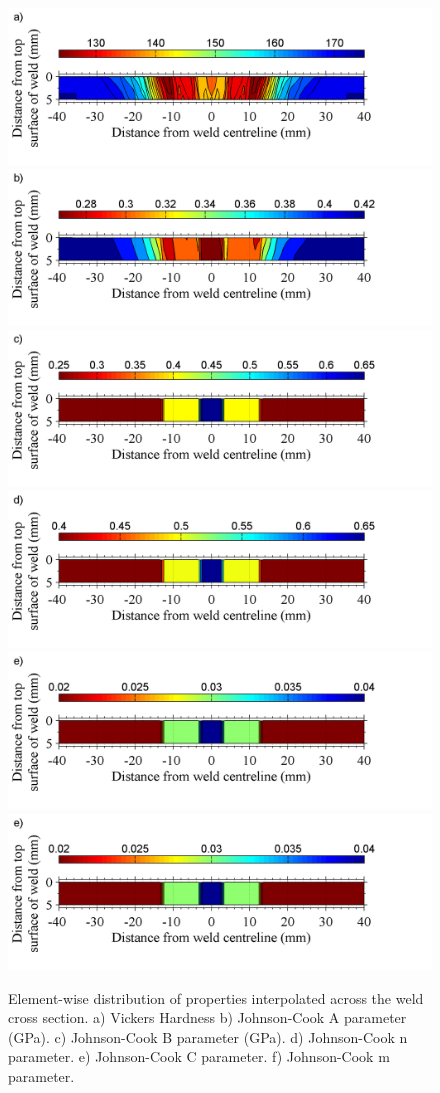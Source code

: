 \begin{figure}
	\centering
	\includegraphics[width=0.55\linewidth]{JCHValtered}
	\includegraphics[width=0.55\linewidth]{JCAaltered}
	\includegraphics[width=0.55\linewidth]{JCBaltered}
	\includegraphics[width=0.55\linewidth]{JCnaltered}
	\includegraphics[width=0.55\linewidth]{JCCaltered}
	\includegraphics[width=0.55\linewidth]{JCCaltered}
	\caption[Mesh]{Element-wise distribution of properties interpolated across the weld cross section. a) Vickers Hardness b) Johnson-Cook A parameter (GPa). c) Johnson-Cook B parameter (GPa). d) Johnson-Cook n parameter. e) Johnson-Cook C parameter. f) Johnson-Cook m parameter.}
	\label{fig:colormaps}
\end{figure} 

